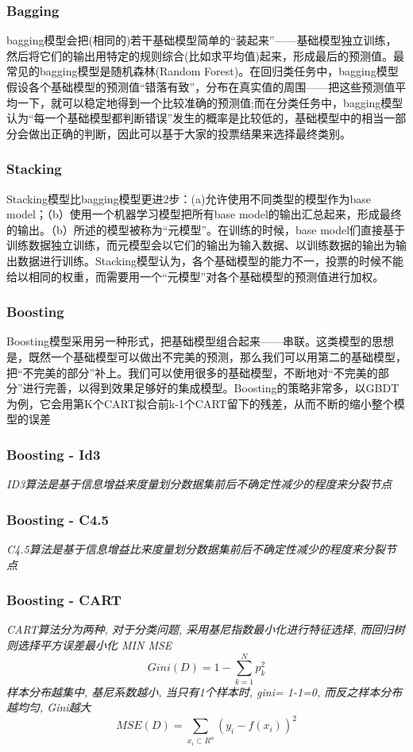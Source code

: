 \documentclass{scrartcl}
\numberwithin{equation}{section}
\begin{document}
\subsubsection{Bagging}
bagging模型会把(相同的)若干基础模型简单的“装起来”——基础模型独立训练，然后将它们的输出用特定的规则综合(比如求平均值)起来，形成最后的预测值。最常见的bagging模型是随机森林(Random Forest)。在回归类任务中，bagging模型假设各个基础模型的预测值“错落有致”，分布在真实值的周围——把这些预测值平均一下，就可以稳定地得到一个比较准确的预测值;而在分类任务中，bagging模型认为“每一个基础模型都判断错误”发生的概率是比较低的，基础模型中的相当一部分会做出正确的判断，因此可以基于大家的投票结果来选择最终类别。
\subsubsection{Stacking}
Stacking模型比bagging模型更进2步：(a)允许使用不同类型的模型作为base model；（b）使用一个机器学习模型把所有base model的输出汇总起来，形成最终的输出。（b）所述的模型被称为“元模型”。在训练的时候，base model们直接基于训练数据独立训练，而元模型会以它们的输出为输入数据、以训练数据的输出为输出数据进行训练。Stacking模型认为，各个基础模型的能力不一，投票的时候不能给以相同的权重，而需要用一个“元模型”对各个基础模型的预测值进行加权。
\subsubsection{Boosting}
Boosting模型采用另一种形式，把基础模型组合起来——串联。这类模型的思想是，既然一个基础模型可以做出不完美的预测，那么我们可以用第二的基础模型，把“不完美的部分”补上。我们可以使用很多的基础模型，不断地对“不完美的部分”进行完善，以得到效果足够好的集成模型。Boosting的策略非常多，以GBDT为例，它会用第K个CART拟合前k-1个CART留下的残差，从而不断的缩小整个模型的误差
\subsubsection{Boosting - Id3}
\textsl{ID3算法是基于信息增益来度量划分数据集前后不确定性减少的程度来分裂节点}

\subsubsection{Boosting - C4.5}
\textsl{C4.5算法是基于信息增益比来度量划分数据集前后不确定性减少的程度来分裂节点}
\subsubsection{Boosting - CART}
\textsl{CART算法分为两种, 对于分类问题, 采用基尼指数最小化进行特征选择, 而回归树则选择平方误差最小化 MIN MSE $$Gini(D) = 1- \sum_{k=1}^N p_k^2$$ 样本分布越集中, 基尼系数越小, 当只有1个样本时, gini= 1-1=0, 而反之样本分布越均匀, Gini越大$$MSE(D) =  \sum_{x_i \subset R^n} (y_i - f(x_i))^2$$}
\end{document}
